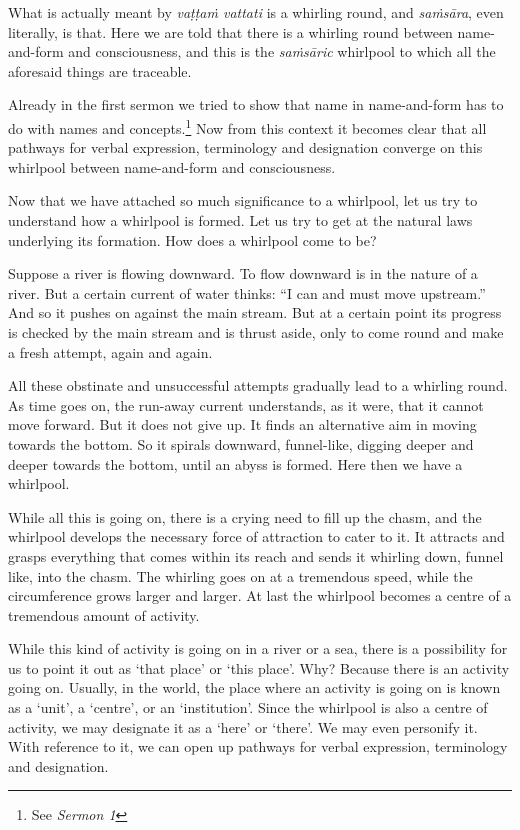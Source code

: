 What is actually meant by \emph{vaṭṭaṁ vattati} is a whirling round, and \emph{saṁsāra}, even literally, is that. Here we are told that there is a whirling round between name-and-form and consciousness, and this is the \emph{saṁsāric} whirlpool to which all the aforesaid things are traceable.

Already in the first sermon we tried to show that name in name-and-form has to do with names and concepts.\footnote{See \emph{Sermon 1}} Now from this context it becomes clear that all pathways for verbal expression, terminology and designation converge on this whirlpool between name-and-form and consciousness.

Now that we have attached so much significance to a whirlpool, let us try to understand how a whirlpool is formed. Let us try to get at the natural laws underlying its formation. How does a whirlpool come to be?

Suppose a river is flowing downward. To flow downward is in the nature of a river. But a certain current of water thinks: ``I can and must move upstream.'' And so it pushes on against the main stream. But at a certain point its progress is checked by the main stream and is thrust aside, only to come round and make a fresh attempt, again and again.

All these obstinate and unsuccessful attempts gradually lead to a whirling round. As time goes on, the run-away current understands, as it were, that it cannot move forward. But it does not give up. It finds an alternative aim in moving towards the bottom. So it spirals downward, funnel-like, digging deeper and deeper towards the bottom, until an abyss is formed. Here then we have a whirlpool.

While all this is going on, there is a crying need to fill up the chasm, and the whirlpool develops the necessary force of attraction to cater to it. It attracts and grasps everything that comes within its reach and sends it whirling down, funnel like, into the chasm. The whirling goes on at a tremendous speed, while the circumference grows larger and larger. At last the whirlpool becomes a centre of a tremendous amount of activity.

While this kind of activity is going on in a river or a sea, there is a possibility for us to point it out as `that place' or `this place'. Why? Because there is an activity going on. Usually, in the world, the place where an activity is going on is known as a `unit', a `centre', or an `institution'. Since the whirlpool is also a centre of activity, we may designate it as a `here' or `there'. We may even personify it. With reference to it, we can open up pathways for verbal expression, terminology and designation.

